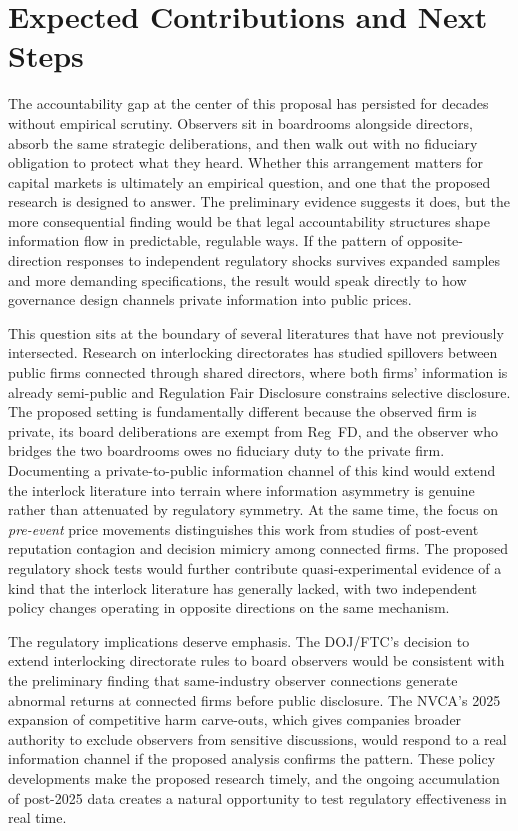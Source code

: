 \section{Expected Contributions and Next Steps}
\label{sec:conclusion}

The accountability gap at the center of this proposal has persisted for decades without empirical scrutiny. Observers sit in boardrooms alongside directors, absorb the same strategic deliberations, and then walk out with no fiduciary obligation to protect what they heard. Whether this arrangement matters for capital markets is ultimately an empirical question, and one that the proposed research is designed to answer. The preliminary evidence suggests it does, but the more consequential finding would be that legal accountability structures shape information flow in predictable, regulable ways. If the pattern of opposite-direction responses to independent regulatory shocks survives expanded samples and more demanding specifications, the result would speak directly to how governance design channels private information into public prices.

This question sits at the boundary of several literatures that have not previously intersected. Research on interlocking directorates has studied spillovers between public firms connected through shared directors, where both firms' information is already semi-public and Regulation Fair Disclosure constrains selective disclosure. The proposed setting is fundamentally different because the observed firm is private, its board deliberations are exempt from Reg~FD, and the observer who bridges the two boardrooms owes no fiduciary duty to the private firm. Documenting a private-to-public information channel of this kind would extend the interlock literature into terrain where information asymmetry is genuine rather than attenuated by regulatory symmetry. At the same time, the focus on \textit{pre-event} price movements distinguishes this work from studies of post-event reputation contagion and decision mimicry among connected firms. The proposed regulatory shock tests would further contribute quasi-experimental evidence of a kind that the interlock literature has generally lacked, with two independent policy changes operating in opposite directions on the same mechanism.

The regulatory implications deserve emphasis. The DOJ/FTC's decision to extend interlocking directorate rules to board observers would be consistent with the preliminary finding that same-industry observer connections generate abnormal returns at connected firms before public disclosure. The NVCA's 2025 expansion of competitive harm carve-outs, which gives companies broader authority to exclude observers from sensitive discussions, would respond to a real information channel if the proposed analysis confirms the pattern. These policy developments make the proposed research timely, and the ongoing accumulation of post-2025 data creates a natural opportunity to test regulatory effectiveness in real time.

